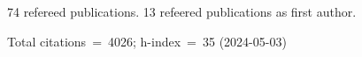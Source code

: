 74 refereed publications. 13 refeered publications as first author.

Total citations~=~4026; h-index~=~35 (2024-05-03)